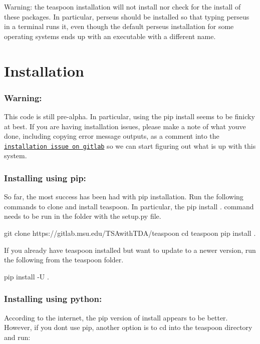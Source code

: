 Warning\+: the teaspoon installation will not install nor check for the install of these packages. In particular, perseus should be installed so that typing {\ttfamily perseus} in a terminal runs it, even though the default perseus installation for some operating systems ends up with an executable with a different name.

\section*{Installation }

\subsubsection*{Warning\+:}

This code is still pre-\/alpha. In particular, using the pip install seems to be finicky at best. If you are having installation issues, please make a note of what you\textquotesingle{}ve done, including copying error message outputs, as a comment into the \href{https://gitlab.msu.edu/TSAwithTDA/teaspoon/issues/1}{\tt installation issue on gitlab} so we can start figuring out what is up with this system.

\subsubsection*{Installing using pip\+:}

So far, the most success has been had with pip installation. Run the following commands to clone and install teaspoon. In particular, the {\ttfamily pip install .} command needs to be run in the folder with the {\ttfamily setup.\+py} file.


\begin{DoxyCode}
git clone https://gitlab.msu.edu/TSAwithTDA/teaspoon
cd teaspoon
pip install .
\end{DoxyCode}


If you already have teaspoon installed but want to update to a newer version, run the following from the teaspoon folder. 
\begin{DoxyCode}
pip install -U .
\end{DoxyCode}


\subsubsection*{Installing using python\+:}

According to the internet, the pip version of install appears to be better. However, if you don\textquotesingle{}t use pip, another option is to cd into the teaspoon directory and run\+:


